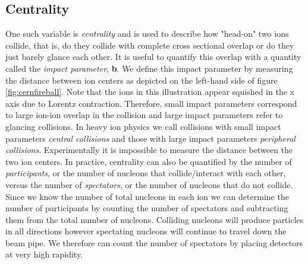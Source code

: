 \subsection{Centrality}
One such variable is \textit{centrality} and is used to describe how "head-on" two ions collide, that is, do they collide with complete cross sectional overlap or do they just barely glance each other. It is useful to quantify this overlap with a quantity called the \textit{impact parameter}, \textbf{b}. We define this impact parameter by measuring the distance between ion centers as depicted on the left-hand side of figure \ref{fig:cernfireball}. Note that the ions in this illustration appear squished in the x axis due to Lorentz contraction. Therefore, small impact parameters correspond to large ion-ion overlap in the collision and large impact parameters refer to glancing collisions. In heavy ion physics we call collisions with small impact parameters \textit{central collisions} and those with large impact parameters \textit{peripheral collisions}. Experimentally it is impossible to measure the distance between the two ion centers. In practice, centrality can also be quantified by the number of \textit{participants}, or the number of nucleons that collide/interact with each other, versus the number of \textit{spectators}, or the number of nucleons that do not collide. Since we know the number of total nucleons in each ion we can determine the number of participants by counting the number of spectators and subtracting them from the total number of nucleons. Colliding nucleons will produce particles in all directions however spectating nucleons will continue to travel down the beam pipe. We therefore can count the number of spectators by placing detectors at very high rapidity.

